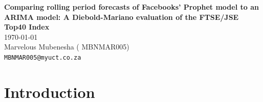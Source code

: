 \documentclass[12pt,a4paper]{article}
\numberwithin{equation}{section}
\numberwithin{figure}{section}
\numberwithin{table}{section}
\begin{document}
\begin{titlepage}

\begin{center}
{\Huge \bf Comparing rolling period forecasts of Facebooks' Prophet model to an
ARIMA model: A Diebold-Mariano evaluation of the FTSE/JSE Top40 Index}\\
\today\\
Marvelous Mubenesha ( MBNMAR005)\\
{\tt MBNMAR005@myuct.co.za}
\end{center}

\begin{abstract}
Facebook's data science team open-sourced Prophet, a package that allows
analysts to forecast a wide range of business time series at-scale.
Prophet employs intensive Bayesian modelling in two tiers. Purely
through MAP parameter estimation, and in a quasi-Bayesian form through
an automated forecast evaluation that enables analyst to improve a
forecasting model if it underperforms when compared to other traditional
models. This paper assesses the predictive accuracy of Prophets'
forecasts to those of an ARIMA model that was identified using the
Box-Jenkins methodology. This is achieved through a Diebold-Mariano
evaluation of the rolling period forecast errors of returns on the
FTSE/JSE Top40 Index across daily, weekly and monthly time horizons. The
results of the study suggest that there is insufficient evidence to
conclude that the forecasting models have unequal predictive ability
within the scope of the FTSE/JSE Top40 Index.
\noindent
Keywords: prophet forecasting, arima forecasting, Box-Jenkins methodology,Diebold-Mariano test,multi-step rolling window forecasts, FTSE/JSE Top40 index.
\end{abstract}
\end{titlepage}


\section{\texorpdfstring{Introduction\label{Introduction}}{Introduction}}\label{introduction}
\end{document}
